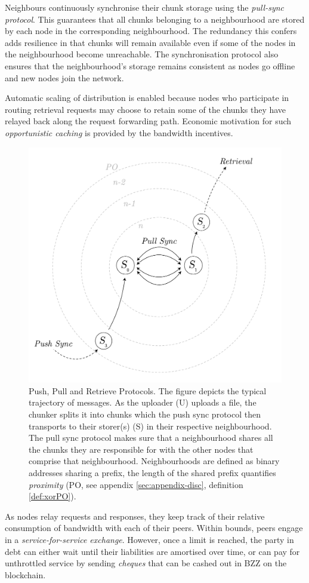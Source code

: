 Neighbours continuously synchronise their chunk storage using the \emph{pull-sync protocol}. This guarantees that all chunks belonging to a neighbourhood are stored by each  node in the corresponding neighbourhood. The redundancy this confers adds resilience in that chunks will remain available even if some of the nodes in the neighbourhood become unreachable. The synchronisation protocol also ensures that the neighbourhood's storage remains consistent as nodes go offline and new nodes join the network. 


Automatic scaling of distribution is enabled because nodes who participate in routing retrieval requests may choose to retain some of the chunks they have relayed back along the request forwarding path. Economic motivation for such \emph{opportunistic caching} is provided by the bandwidth incentives.



\begin{figure}[!th]
  \centering
    \includegraphics[width=.5\textwidth]{fig/pull-push-retrieve.pdf}
  \caption[Push, Pull and Retrieve Protocols]{Push, Pull and Retrieve Protocols. The figure depicts the typical trajectory of messages. As the uploader (U) uploads a file, the chunker splits it into chunks which the push sync protocol then transports to their storer(s) (S) in their respective neighbourhood. The pull sync protocol makes sure that a neighbourhood shares all the chunks they are responsible for with the other nodes that comprise that neighbourhood. Neighbourhoods are defined as binary addresses sharing a prefix, the length of the shared prefix quantifies \emph{proximity} (PO, see appendix \ref{sec:appendix-disc}, definition \ref{def:xorPO}).}
  \label{fig:push-pull-retrieve}
\end{figure}


As nodes relay requests and responses, they keep track of their relative consumption of bandwidth with each of their peers. Within bounds, peers engage in a \emph{service-for-service exchange}.
However, once a limit is reached, the party in debt can either wait until their liabilities are amortised over time, or can pay for unthrottled service by sending \emph{cheques} that can  be cashed out in BZZ on the blockchain.


